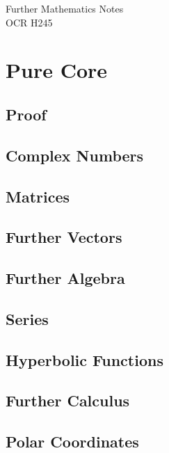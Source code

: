 \documentclass[a4paper]{report}
\begin{document}
\begin{titlepage}
	\raggedleft
	\vspace*{2cm}
	\Huge{Further Mathematics Notes}\\
	\vspace{0.5cm}
	\large{OCR H245}
\end{titlepage}

\tableofcontents

\part{Pure Core}

\chapter{Proof}

\chapter{Complex Numbers}

\chapter{Matrices}

\chapter{Further Vectors}

\chapter{Further Algebra}

\chapter{Series}

\chapter{Hyperbolic Functions}

\chapter{Further Calculus}

\chapter{Polar Coordinates}
\end{document}

